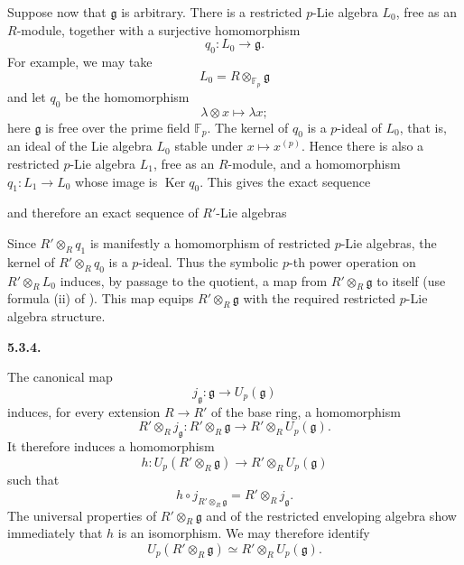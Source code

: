 Suppose now that \(\mathfrak g\) is arbitrary. There is a
restricted \(p\)-Lie algebra \(L_0\), free as an \(R\)-module,
together with a surjective homomorphism
\[
  q_0:L_0\longrightarrow\mathfrak g.
\]
For example, we may take
\[
  L_0=R\otimes_{\mathbb F_p}\mathfrak g
\]
and let \(q_0\) be the homomorphism
\[
  \lambda\otimes x\longmapsto\lambda x;
\]
here \(\mathfrak g\) is free over the prime field
\(\mathbb F_p\). The kernel of \(q_0\) is a \(p\)-ideal of
\(L_0\), that is, an ideal of the Lie algebra \(L_0\) stable
under \(x\mapsto x^{(p)}\). Hence there is also a restricted
\(p\)-Lie algebra \(L_1\), free as an \(R\)-module, and a
homomorphism \(q_1:L_1\to L_0\) whose image is
\(\operatorname{Ker}q_0\). This gives the exact sequence
\begin{center}
  \label{sga3:VIIA:5.3.3bis-exact-sequence}
  
\end{center}
and therefore an exact sequence of \(R'\)-Lie algebras
\begin{center}
  \label{sga3:VIIA:5.3.3bis-basechange-exact-sequence}
  
\end{center}

Since \(R'\otimes_Rq_1\) is manifestly a homomorphism of
restricted \(p\)-Lie algebras, the kernel of
\(R'\otimes_Rq_0\) is a \(p\)-ideal. Thus the symbolic \(p\)-th
power operation on \(R'\otimes_RL_0\) induces, by passage to the
quotient, a map from \(R'\otimes_R\mathfrak g\) to itself (use
formula (ii) of ). This map equips \(R'\otimes_R\mathfrak g\)
with the required restricted \(p\)-Lie algebra structure.

\medskip
\noindent\textbf{5.3.4.}
\label{sga3:VIIA:5.3.4}

The canonical map
\[
  j_{\mathfrak g}:\mathfrak g\longrightarrow U_p(\mathfrak g)
\]
induces, for every extension \(R\to R'\) of the base ring, a
homomorphism
\[
  R'\otimes_Rj_{\mathfrak g}:
  R'\otimes_R\mathfrak g
  \longrightarrow
  R'\otimes_RU_p(\mathfrak g).
\]
It therefore induces a homomorphism
\[
  h:
  U_p(R'\otimes_R\mathfrak g)
  \longrightarrow
  R'\otimes_RU_p(\mathfrak g)
\]
such that
\[
  h\circ j_{R'\otimes_R\mathfrak g}
  =
  R'\otimes_Rj_{\mathfrak g}.
\]
The universal properties of \(R'\otimes_R\mathfrak g\) and of
the restricted enveloping algebra show immediately that \(h\) is
an isomorphism. We may therefore identify
\[
  U_p(R'\otimes_R\mathfrak g)
  \simeq
  R'\otimes_RU_p(\mathfrak g).
\]

